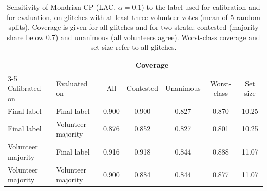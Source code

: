 \begin{table}[!htbp]
\caption{Sensitivity of Mondrian CP (LAC, $\alpha=0.1$) to the label used for calibration and for evaluation, on glitches with at
least three volunteer votes (mean of 5 random splits). Coverage is given for all glitches and for two strata: contested (majority
share below 0.7) and unanimous (all volunteers agree). Worst-class coverage and set size refer to all glitches.}\label{tab:e4}
\centering\footnotesize\setlength{\tabcolsep}{4pt}
\begin{tabular}{llccccc}\toprule
 & & \multicolumn{3}{c}{Coverage} & & \\\cmidrule(lr){3-5}
Calibrated on & Evaluated on & All & Contested & Unanimous & Worst-class & Set size\\\midrule
Final label & Final label & 0.900 & 0.900 & 0.827 & 0.870 & 10.25\\
Final label & Volunteer majority & 0.876 & 0.852 & 0.827 & 0.801 & 10.25\\
Volunteer majority & Final label & 0.916 & 0.918 & 0.844 & 0.888 & 11.07\\
Volunteer majority & Volunteer majority & 0.900 & 0.884 & 0.844 & 0.877 & 11.07\\
\bottomrule
\end{tabular}
\end{table}

